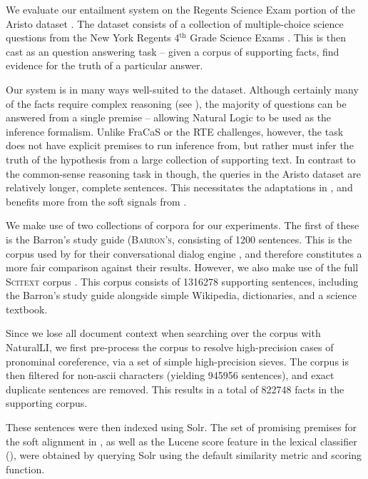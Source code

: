 %
%
We evaluate our entailment system on the Regents Science Exam portion of
  the Aristo dataset \cite{key:2013clark-aristo,key:2015clark-aristo}.
The dataset consists of a collection of multiple-choice science questions
  from the New York Regents 4$^{\textrm{th}}$ Grade Science Exams
  \cite{key:NYSED}.
This is then cast as an question answering task -- given a corpus of
  supporting facts, find evidence for the truth of a particular answer.

Our system is in many ways well-suited to the dataset.
Although certainly many of the facts require complex reasoning
  (see ), the majority of questions can be
  answered from a single premise -- allowing Natural Logic to be used
  as the inference formalism.
Unlike FraCaS or the RTE challenges, however, the task does not have explicit
  premises to run inference from, but rather must infer the truth of the
  hypothesis from a large collection of supporting text.
In contrast to the common-sense reasoning task in 
  though, the queries in the Aristo dataset are relatively longer, complete sentences.
This necessitates the adaptations in , and benefits more from the
  soft signals from .

We make use of two collections of corpora for our experiments.
The first of these is the Barron's study guide (\textsc{Barron's}, 
  consisting of \num{1200} sentences.
This is the corpus used by  for their conversational
  dialog engine \knowbot, and therefore constitutes a more fair comparison against 
  their results.
However, we also make use of the full \textsc{Scitext} corpus \cite{key:2014clark-aristo}.
This corpus consists of \num{1316278} supporting sentences, 
  including the Barron's study guide alongside 
  simple Wikipedia, dictionaries, and a science textbook.

Since we lose all document context when searching over the corpus with NaturalLI,
  we first pre-process the corpus to resolve high-precision cases of
  pronominal coreference, via a set of simple high-precision sieves.
The corpus is then filtered for non-ascii characters (yielding \num{945956} sentences),
  and exact duplicate sentences are removed.
This results in a total of \num{822748} facts in the supporting corpus.

These sentences were then indexed using Solr.
The set of promising premises for the soft alignment in , as well as
  the Lucene score feature in the lexical classifier (),
  were obtained by querying Solr using the default similarity metric and scoring function.

